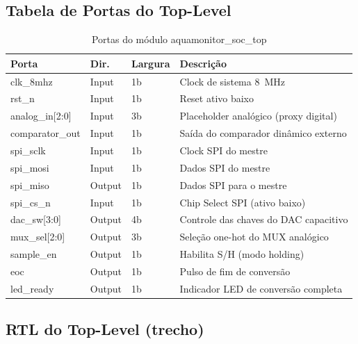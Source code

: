 \documentclass[12pt,a4paper]{article}
\begin{document}
\subsection{Tabela de Portas do Top-Level}

\begin{table}[H]
  \centering
  \caption{Portas do módulo aquamonitor\_soc\_top}
  \label{tab:toplevel_ports}
  \begin{tabular}{lllp{6cm}}
    \toprule
    \textbf{Porta} & \textbf{Dir.} & \textbf{Largura} & \textbf{Descrição} \\
    \midrule
    clk\_8mhz       & Input  & 1b    & Clock de sistema \SI{8}{\mega\hertz} \\
    rst\_n          & Input  & 1b    & Reset ativo baixo \\
    analog\_in[2:0] & Input  & 3b    & Placeholder analógico (proxy digital) \\
    comparator\_out & Input  & 1b    & Saída do comparador dinâmico externo \\
    spi\_sclk       & Input  & 1b    & Clock SPI do mestre \\
    spi\_mosi       & Input  & 1b    & Dados SPI do mestre \\
    spi\_miso       & Output & 1b    & Dados SPI para o mestre \\
    spi\_cs\_n      & Input  & 1b    & Chip Select SPI (ativo baixo) \\
    dac\_sw[3:0]    & Output & 4b    & Controle das chaves do DAC capacitivo \\
    mux\_sel[2:0]   & Output & 3b    & Seleção one-hot do MUX analógico \\
    sample\_en      & Output & 1b    & Habilita S/H (modo holding) \\
    eoc             & Output & 1b    & Pulso de fim de conversão \\
    led\_ready      & Output & 1b    & Indicador LED de conversão completa \\
    \bottomrule
  \end{tabular}
\end{table}

\subsection{RTL do Top-Level (trecho)}
\end{document}

